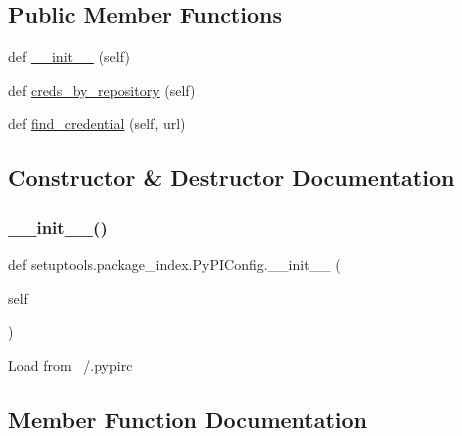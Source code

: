 \subsection*{Public Member Functions}
\begin{DoxyCompactItemize}
\item 
def \hyperlink{classsetuptools_1_1package__index_1_1PyPIConfig_a32593240a32dc851f55b82f1abebbc86}{\+\_\+\+\_\+init\+\_\+\+\_\+} (self)
\item 
def \hyperlink{classsetuptools_1_1package__index_1_1PyPIConfig_adc322072461ff5f3499d6187040ebc91}{creds\+\_\+by\+\_\+repository} (self)
\item 
def \hyperlink{classsetuptools_1_1package__index_1_1PyPIConfig_a591eed255577ae924d683a1cdfc6cbbd}{find\+\_\+credential} (self, url)
\end{DoxyCompactItemize}


\subsection{Constructor \& Destructor Documentation}
\mbox{\label{classsetuptools_1_1package__index_1_1PyPIConfig_a32593240a32dc851f55b82f1abebbc86}} 
\subsubsection{\texorpdfstring{\+\_\+\+\_\+init\+\_\+\+\_\+()}{\_\_init\_\_()}}
{\footnotesize\ttfamily def setuptools.\+package\+\_\+index.\+Py\+P\+I\+Config.\+\_\+\+\_\+init\+\_\+\+\_\+ (\begin{DoxyParamCaption}\item[{}]{self }\end{DoxyParamCaption})}

\begin{DoxyVerb}Load from ~/.pypirc
\end{DoxyVerb}
 

\subsection{Member Function Documentation}
\mbox{\label{classsetuptools_1_1package__index_1_1PyPIConfig_adc322072461ff5f3499d6187040ebc91}} 
